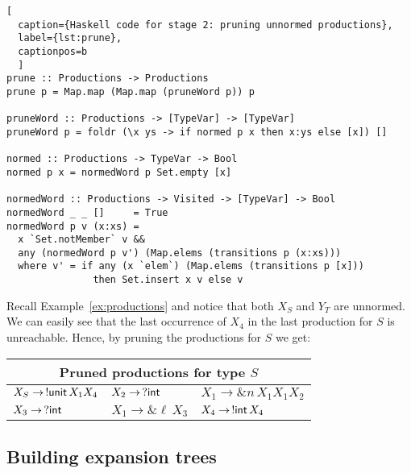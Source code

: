 \begin{lstlisting}[
  caption={Haskell code for stage 2: pruning unnormed productions},
  label={lst:prune},
  captionpos=b
  ]
prune :: Productions -> Productions
prune p = Map.map (Map.map (pruneWord p)) p

pruneWord :: Productions -> [TypeVar] -> [TypeVar]
pruneWord p = foldr (\x ys -> if normed p x then x:ys else [x]) []

normed :: Productions -> TypeVar -> Bool
normed p x = normedWord p Set.empty [x]

normedWord :: Productions -> Visited -> [TypeVar] -> Bool
normedWord _ _ []     = True
normedWord p v (x:xs) =
  x `Set.notMember` v &&
  any (normedWord p v') (Map.elems (transitions p (x:xs)))
  where v' = if any (x `elem`) (Map.elems (transitions p [x]))
               then Set.insert x v else v
\end{lstlisting}

\begin{example}
  \label{ex:prune}
  Recall Example~\ref{ex:productions} and notice that both
  $X_S$ and
  $Y_T$ are unnormed. We can easily see that the last occurrence of
  $X_4$ in the last production for
  $S$ is unreachable. Hence, by pruning the productions for
  $S$ we get:
  \begin{center}
    \begin{tabular}{l l l}
      \multicolumn{3}{c}{Pruned productions for type $S$}\\ \hline
      $X_S \rightarrow \,!\mathsf{unit}\, X_1 X_4$ &
      $X_2 \rightarrow \,? \mathsf{int}$ &
      $X_1 \rightarrow \& n\, X_1 X_1 X_2$
      \\
      $X_3 \rightarrow \,? \mathsf{int}$ &
      $X_1 \rightarrow \& \ell\, X_3$ &
      $X_4 \rightarrow \,!\mathsf{int}\, X_4$
    \end{tabular}
  \end{center}
\end{example}

\subsection{Building expansion trees}
\label{subsec:expand}


